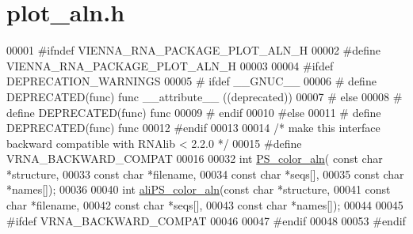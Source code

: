 \hypertarget{plot__aln_8h_source}{}\section{plot\+\_\+aln.\+h}
\label{plot__aln_8h_source}

\begin{DoxyCode}
00001 \textcolor{preprocessor}{#ifndef VIENNA\_RNA\_PACKAGE\_PLOT\_ALN\_H}
00002 \textcolor{preprocessor}{#define VIENNA\_RNA\_PACKAGE\_PLOT\_ALN\_H}
00003 
00004 \textcolor{preprocessor}{#ifdef DEPRECATION\_WARNINGS}
00005 \textcolor{preprocessor}{# ifdef \_\_GNUC\_\_}
00006 \textcolor{preprocessor}{#  define DEPRECATED(func) func \_\_attribute\_\_ ((deprecated))}
00007 \textcolor{preprocessor}{# else}
00008 \textcolor{preprocessor}{#  define DEPRECATED(func) func}
00009 \textcolor{preprocessor}{# endif}
00010 \textcolor{preprocessor}{#else}
00011 \textcolor{preprocessor}{# define DEPRECATED(func) func}
00012 \textcolor{preprocessor}{#endif}
00013 
00014 \textcolor{comment}{/* make this interface backward compatible with RNAlib < 2.2.0 */}
00015 \textcolor{preprocessor}{#define VRNA\_BACKWARD\_COMPAT}
00016 
00032 \textcolor{keywordtype}{int} \hyperlink{group__plotting__utils_ga821802c3685e37e15182341f6217470d}{PS\_color\_aln}( \textcolor{keyword}{const} \textcolor{keywordtype}{char} *structure,
00033                   \textcolor{keyword}{const} \textcolor{keywordtype}{char} *filename,
00034                   \textcolor{keyword}{const} \textcolor{keywordtype}{char} *seqs[],
00035                   \textcolor{keyword}{const} \textcolor{keywordtype}{char} *names[]);
00036 
00040 \textcolor{keywordtype}{int} \hyperlink{group__plotting__utils_gaab48d4dac655d688abe921389ac2847c}{aliPS\_color\_aln}(\textcolor{keyword}{const} \textcolor{keywordtype}{char} *structure,
00041                     \textcolor{keyword}{const} \textcolor{keywordtype}{char} *filename, 
00042                     \textcolor{keyword}{const} \textcolor{keywordtype}{char} *seqs[],
00043                     \textcolor{keyword}{const} \textcolor{keywordtype}{char} *names[]); 
00044 
00045 \textcolor{preprocessor}{#ifdef VRNA\_BACKWARD\_COMPAT}
00046 
00047 \textcolor{preprocessor}{#endif}
00048 
00053 \textcolor{preprocessor}{#endif}
\end{DoxyCode}
